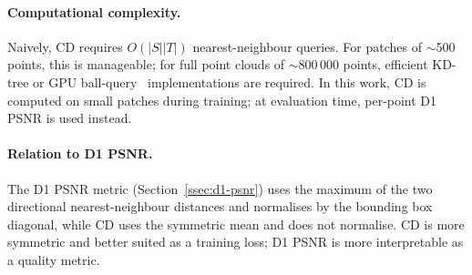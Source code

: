 \paragraph{Computational complexity.}
Naively, CD requires $O(|S||T|)$ nearest-neighbour queries.
For patches of $\sim$500 points, this is manageable; for full point clouds of
$\sim$800\,000 points, efficient KD-tree or GPU ball-query~\cite{qi2017pointnetplusplus} implementations
are required.
In this work, CD is computed on small patches during training; at evaluation
time, per-point D1 PSNR is used instead.

\paragraph{Relation to D1 PSNR.}
The D1 PSNR metric (Section~\ref{ssec:d1-psnr}) uses the maximum of the
two directional nearest-neighbour distances and normalises by the bounding
box diagonal, while CD uses the symmetric mean and does not normalise.
CD is more symmetric and better suited as a training loss; D1 PSNR is more
interpretable as a quality metric.


